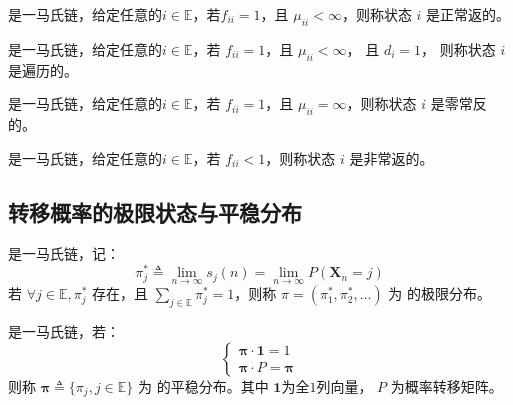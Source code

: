         \begin{definition}[正常返]
            \MarkovChain 是一马氏链，给定任意的$i \in \mathbb{E}$，若$f_{ii} = 1$，且 $ \mu_{ii} < \infty$，则称状态 $i$ 是正常返的。
        \end{definition}

        \begin{definition}[遍历]
            \MarkovChain 是一马氏链，给定任意的$i \in \mathbb{E}$，若 $f_{ii} = 1$，且 $ \mu_{ii} < \infty$， 且 $d_i = 1$， 则称状态 $i$ 是遍历的。
        \end{definition}

        \begin{definition}[零常返]
            \MarkovChain 是一马氏链，给定任意的$i \in \mathbb{E}$，若 $f_{ii} = 1$，且 $ \mu_{ii} = \infty$，则称状态 $i$ 是零常反的。
        \end{definition}

        \begin{definition}[非常返]
            \MarkovChain 是一马氏链，给定任意的$i \in \mathbb{E}$，若 $f_{ii} < 1$，则称状态 $i$ 是非常返的。
        \end{definition}

    \subsection{转移概率的极限状态与平稳分布}
        
        \begin{definition}[极限分布]
            \MarkovChain 是一马氏链，记：
            \[\pi_j^* \triangleq \lim\limits_{n \to \infty} s_j(n) = \lim\limits_{n \to \infty} P(\textbf{X}_n = j)\]
            若 $\forall j \in \mathbb{E}, \pi_j^*$ 存在，且 $\sum\limits_{j \in \mathbb{E}} \pi_j^* = 1$，则称 $\pi = (\pi_1^*, \pi_2^*, \ldots)$ 为 \MarkovChain 的极限分布。
        \end{definition}

        \begin{definition}[平稳分布]
            \MarkovChain 是一马氏链，若：
            \[
                \left\{
                    \begin{array}{l}
                        \bm{\pi} \cdot \bm{1} = 1 \\
                        \bm{\pi} \cdot P = \bm{\pi}
                    \end{array}
                \right.
            \]
            则称 $ \bm{\pi} \triangleq \{\pi_j, j \in \mathbb{E}\}$ 为 \MarkovChain 的平稳分布。其中 $\bm{1}$为全$1$列向量， $P$ 为概率转移矩阵。
        \end{definition}
